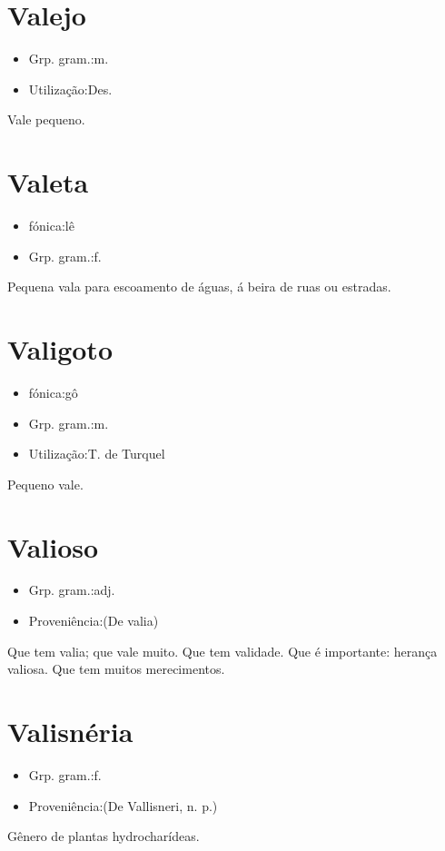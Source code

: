 \documentclass{article}
\begin{document}
\section{Valejo}
\begin{itemize}
\item {Grp. gram.:m.}
\end{itemize}
\begin{itemize}
\item {Utilização:Des.}
\end{itemize}
Vale pequeno.
\section{Valeta}
\begin{itemize}
\item {fónica:lê}
\end{itemize}
\begin{itemize}
\item {Grp. gram.:f.}
\end{itemize}
Pequena vala para escoamento de águas, á beira de ruas ou estradas.
\section{Valigoto}
\begin{itemize}
\item {fónica:gô}
\end{itemize}
\begin{itemize}
\item {Grp. gram.:m.}
\end{itemize}
\begin{itemize}
\item {Utilização:T. de Turquel}
\end{itemize}
Pequeno vale.
\section{Valioso}
\begin{itemize}
\item {Grp. gram.:adj.}
\end{itemize}
\begin{itemize}
\item {Proveniência:(De \textunderscore valia\textunderscore )}
\end{itemize}
Que tem valia; que vale muito.
Que tem validade.
Que é importante: \textunderscore herança valiosa\textunderscore .
Que tem muitos merecimentos.
\section{Valisnéria}
\begin{itemize}
\item {Grp. gram.:f.}
\end{itemize}
\begin{itemize}
\item {Proveniência:(De \textunderscore Vallisneri\textunderscore , n. p.)}
\end{itemize}
Gênero de plantas hydrocharídeas.
\end{document}

